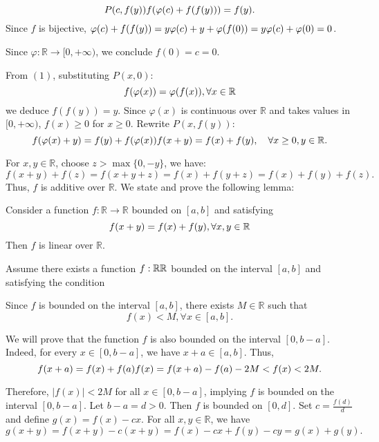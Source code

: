 \documentclass[11pt]{scrartcl}
\begin{document}
\begin{itemize}[label=, leftmargin=0em, itemsep=0.2em]
\begin{sol}
        \[ P(c,f(y)) \ra f(\varphi(c) + f(f(y))) = f(y). \]
        Since \( f \) is bijective, \( \varphi(c) + f(f(y)) = y \ra \varphi(c) + y + \varphi(f(0)) = y \ra \varphi(c) + \varphi(0) = 0 \).

        Since \( \varphi: \mathbb{R} \to [0,+\infty) \), we conclude \( f(0) = c = 0 \).

        From \( (1) \), substituting \( P(x,0) \):
        \[ f(\varphi(x)) = \varphi(f(x)), \forall x\in \mathbb{R} \]
        we deduce \( f(f(y)) = y \). Since \( \varphi(x) \) is continuous over \( \mathbb{R} \) and takes values in \( [0,+\infty) \), \( f(x) \geq 0 \) for \( x \geq 0 \). Rewrite \( P(x,f(y)) \):
        \[ f(\varphi(x) + y) = f(y) + f(\varphi(x)) \ra f(x + y) = f(x) + f(y), \quad \forall x \geq 0, y \in \mathbb{R}. \]

        For \( x, y \in \mathbb{R} \), choose \( z > \max\{0, -y\} \), we have:
        \[ f(x + y) + f(z) = f(x + y + z) = f(x) + f(y + z) = f(x) + f(y) + f(z). \]
        Thus, \( f \) is additive over \( \mathbb{R} \). We state and prove the following lemma:

        \begin{lemma}
        Consider a function \( f: \mathbb{R} \to \mathbb{R} \) bounded on \( [a,b] \) and satisfying
        \[ f(x + y) = f(x) + f(y), \forall x,y \in \mathbb{R} \]
        Then \( f \) is linear over \( \mathbb{R} \).
        \end{lemma}
        \begin{pro}
            Assume there exists a function \( f: \mathbb{R} \ra \mathbb{R} \) bounded on the interval \( [a, b] \) and satisfying the condition

            Since \( f \) is bounded on the interval \( [a, b] \), there exists \( M \in \mathbb{R} \) such that
            \[
            f(x) < M, \forall x \in [a, b].
            \]

            We will prove that the function \( f \) is also bounded on the interval \( [0, b-a] \).
            Indeed, for every \( x \in [0, b-a] \), we have \( x+a \in [a, b] \). Thus,
            \[
            f(x+a) = f(x) + f(a) \ra f(x) = f(x+a) - f(a) \ra -2M < f(x) < 2M.
            \]

            Therefore, \( |f(x)| < 2M \) for all \( x \in [0, b-a] \), implying \( f \) is bounded on the interval \( [0, b-a] \).
            Let \( b-a = d > 0 \). Then \( f \) is bounded on \( [0, d] \). Set \( c = \frac{f(d)}{d} \) and define \( g(x) = f(x) - cx \). For all \( x, y \in \mathbb{R} \), we have
            \[
            g(x+y) = f(x+y) - c(x+y) = f(x) - cx + f(y) - cy = g(x) + g(y).
            \]


\end{pro}
\end{sol}
\end{itemize}
\end{document}
